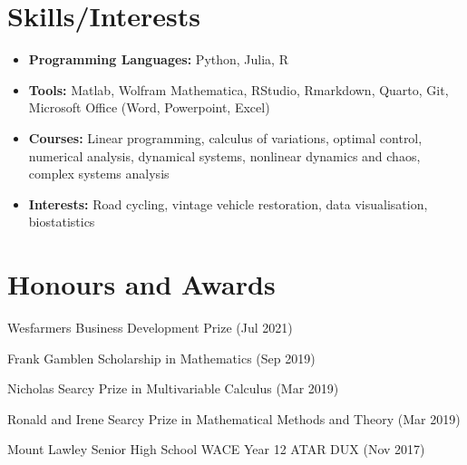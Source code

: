 \documentclass[letterpaper,10.8pt]{article}
\newcommand{\resumeItem}[2]{
  \item\small{
    \textbf{#1}{#2 \vspace{-2pt}}
  }
}
\newcommand{\resumeSubItem}[2]{\resumeItem{#1}{#2}\vspace{-4pt}}
\newcommand{\resumeSubHeadingListStart}{\begin{itemize}[leftmargin=*]}
\newcommand{\resumeSubHeadingListEnd}{\end{itemize}}
\begin{document}
\section{Skills/Interests}
	\resumeSubHeadingListStart
	\resumeSubItem{Programming Languages: }{Python, Julia, R}
	\resumeSubItem{Tools: }{Matlab, Wolfram Mathematica, RStudio, Rmarkdown, Quarto, Git, Microsoft Office (Word, Powerpoint, Excel)}
	\resumeSubItem{Courses: }{Linear programming, calculus of variations, optimal control, numerical analysis, dynamical systems, nonlinear dynamics and chaos, complex systems analysis}
	\resumeSubItem{Interests: }{Road cycling, vintage vehicle restoration, data visualisation, biostatistics}
\resumeSubHeadingListEnd

\section{Honours and Awards}
\begin{description}[font=$\bullet$]
\item {Wesfarmers Business Development Prize (Jul 2021)} 
\item {Frank Gamblen Scholarship in Mathematics (Sep 2019)}
\item {Nicholas Searcy Prize in Multivariable Calculus (Mar 2019)}
\item {Ronald and Irene Searcy Prize in Mathematical Methods and Theory (Mar 2019)}
\item {Mount Lawley Senior High School WACE Year 12 ATAR DUX (Nov 2017)}
\end{description}
\end{document}
